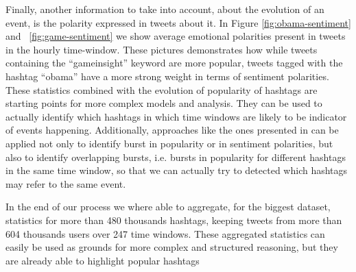 Finally, another information to take into account, about the evolution of an event, is the polarity expressed in tweets about it.
In Figure \ref{fig:obama-sentiment} and ~\ref{fig:game-sentiment} we show average emotional polarities present in tweets in the hourly time-window.
These pictures demonstrates how while tweets containing the ``gameinsight'' keyword are more popular, tweets tagged with the hashtag ``obama'' have a more strong weight in terms of sentiment polarities.
These statistics combined with the evolution of popularity of hashtags are starting points for more complex models and analysis.
They can be used to actually identify which hashtags in which time windows are likely to be indicator of events happening.
Additionally, approaches like the ones presented in \cite{Vlachos:2004:ISP:1007568.1007586} can be applied not only to identify burst in popularity or in sentiment polarities, but also to identify overlapping bursts, i.e. bursts in popularity for different hashtags in the same time window, so that we can actually try to detected which hashtags may refer to the same event.




In the end of our process we where able to aggregate, for the biggest dataset, statistics for  more than 480 thousands hashtags, keeping tweets from more than 604 thousands users over 247 time windows.
These aggregated statistics can easily be used as grounds for more complex and structured reasoning, but they are already able to highlight popular hashtags





